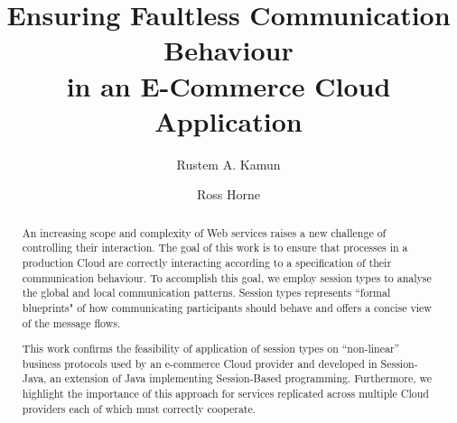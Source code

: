 \documentclass{llncs}
\begin{document}
%
\title{Ensuring Faultless Communication Behaviour\\
       in an E-Commerce Cloud Application}



%
\author{
	Rustem A. Kamun \and Ross Horne
}





\maketitle

\begin{abstract}
  An increasing scope and complexity of Web services raises a new challenge of controlling their interaction. The goal of this work is to ensure that processes in a production Cloud are correctly interacting according to a specification of their communication behaviour. To accomplish this goal, we employ session types to analyse the global and local communication patterns. Session types represents ``formal blueprints" of how communicating participants should behave and offers a concise view of the message flows.
  
  This work confirms the feasibility of application of session types on ``non-linear'' business protocols used by an e-commerce Cloud provider and developed in Session-Java, an extension of Java implementing Session-Based programming. Furthermore, we highlight the importance of this approach for services replicated across multiple Cloud providers each of which must correctly cooperate.
\end{abstract}
\end{document}
